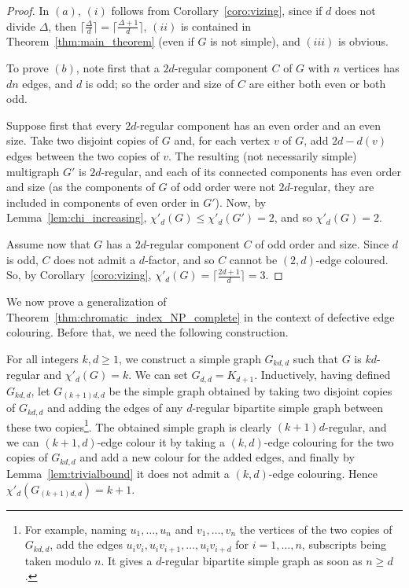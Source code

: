 \begin{proof}
In $(a)$, $(i)$ follows from Corollary~\ref{coro:vizing}, since if $d$ does not divide $\Delta$, then $\lceil \frac{\Delta}{d} \rceil = \lceil \frac{\Delta + 1}{d} \rceil$, $(ii)$ is contained in Theorem~\ref{thm:main_theorem} (even if $G$ is not simple), and $(iii)$ is obvious.

To prove $(b)$, note first that a $2d$-regular component $C$ of $G$ with $n$ vertices has $dn$ edges, and $d$ is odd; so the order and size of $C$ are either both even or both odd. 

Suppose first that every $2d$-regular component has an even order and an even size. Take two disjoint copies of $G$ and, for each vertex $v$ of $G$, add $2d - d(v)$ edges between the two copies of $v$. The resulting (not necessarily simple) multigraph $G'$ is $2d$-regular, and each of its connected components has even order and size (as the components of $G$ of odd order were not $2d$-regular, they are included in components of even order in $G'$). Now, by Lemma~\ref{lem:chi_increasing}, $\chi'_d(G) \leq \chi'_d(G') = 2$, and so $\chi'_d(G) = 2$.

Assume now that $G$ has a $2d$-regular component $C$ of odd order and size. 
Since $d$ is odd,  $C$ does not admit a $d$-factor, and so $C$ cannot be $(2,d)$-edge coloured. So, by Corollary~\ref{coro:vizing}, $\chi'_d(G) = \lceil \frac{2d+1}{d} \rceil= 3$. 

\end{proof}


We now prove a generalization of Theorem~\ref{thm:chromatic_index_NP_complete} in the context of defective edge colouring. Before that, we need the following construction.  



For all integers $k,d \geq 1$, we construct a simple graph $G_{kd, d}$ such that $G$ is $kd$-regular and $\chi'_{d}(G) = k$. 
We can set $G_{d,d} = K_{d+1}$. Inductively, having defined $G_{kd,d}$, let $G_{(k+1)d,d}$ be the simple graph obtained by taking two disjoint copies of $G_{kd,d}$  and adding the edges of any $d$-regular bipartite simple graph between these two copies\footnote{For example, naming $u_1, \dots, u_n$ and $v_1, \dots, v_n$ the vertices of the two copies of $G_{kd,d}$, add the edges $u_iv_i, u_iv_{i+1}, \dots, u_iv_{i+d}$ for $i=1, \dots, n$, subscripts being taken modulo $n$. It gives a $d$-regular bipartite simple graph as soon as $n \geq d$.}. 
The obtained simple graph is clearly $(k+1)d$-regular, and we can $(k+1, d)$-edge colour it by taking a $(k,d)$-edge colouring for the two copies of $G_{kd,d}$ and add a new colour for the added edges, and finally  by Lemma~\ref{lem:trivialbound} it does not admit a $(k,d)$-edge colouring. Hence  $\chi'_d(G_{(k+1)d,d}) = k+1$.

